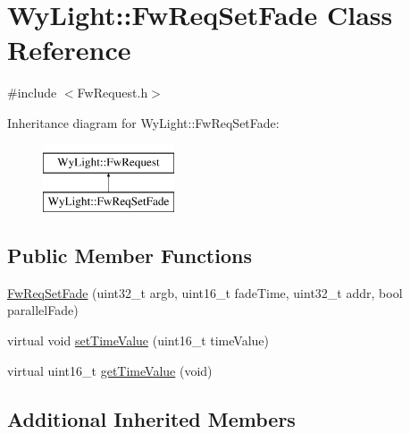 \hypertarget{class_wy_light_1_1_fw_req_set_fade}{\section{Wy\-Light\-:\-:Fw\-Req\-Set\-Fade Class Reference}
\label{class_wy_light_1_1_fw_req_set_fade}
}


{\ttfamily \#include $<$Fw\-Request.\-h$>$}

Inheritance diagram for Wy\-Light\-:\-:Fw\-Req\-Set\-Fade\-:\begin{figure}[H]
\begin{center}
\leavevmode
\includegraphics[height=2.000000cm]{class_wy_light_1_1_fw_req_set_fade}
\end{center}
\end{figure}
\subsection*{Public Member Functions}
\begin{DoxyCompactItemize}
\item 
\hyperlink{class_wy_light_1_1_fw_req_set_fade_a900b872b1d37fddcf64143fc07500a3b}{Fw\-Req\-Set\-Fade} (uint32\-\_\-t argb, uint16\-\_\-t fade\-Time, uint32\-\_\-t addr, bool parallel\-Fade)
\item 
virtual void \hyperlink{class_wy_light_1_1_fw_req_set_fade_a08916f13969ddd9e198aed59d92f7d93}{set\-Time\-Value} (uint16\-\_\-t time\-Value)
\item 
virtual uint16\-\_\-t \hyperlink{class_wy_light_1_1_fw_req_set_fade_aa45c806b78d450a26146126857fa64d7}{get\-Time\-Value} (void)
\end{DoxyCompactItemize}
\subsection*{Additional Inherited Members}


